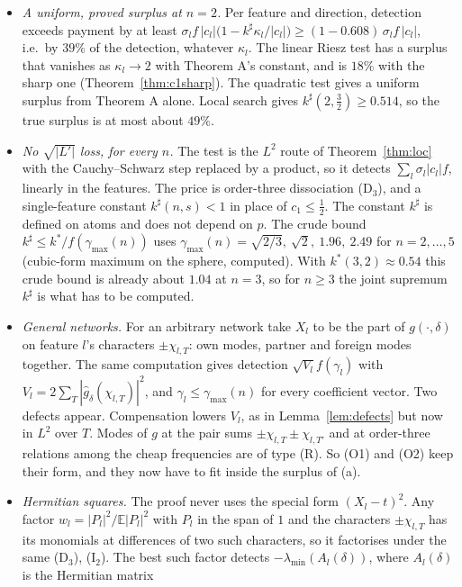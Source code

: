 \documentclass[11pt]{article}
\theoremstyle{definition}
\begin{document}
\begin{itemize}
\item[(a)] \emph{A uniform, proved surplus at $n=2$.}  Per feature and direction, detection exceeds payment by at least
$\sigma_lf\,|c_l|\big(1-k^\sharp\kappa_l/|c_l|\big)\ge(1-0.608)\,\sigma_lf\,|c_l|$, i.e.\ by $39\%$ of the detection, whatever $\kappa_l$.  The linear Riesz test has a surplus that
vanishes as $\kappa_l\to2$ with Theorem A's constant, and is $18\%$ with the sharp one (Theorem~\ref{thm:c1sharp}).  The quadratic test gives a uniform surplus from
Theorem A alone.  Local search gives $k^\sharp(2,\frac32)\ge0.514$, so the true surplus is at most about $49\%$.
\item[(b)] \emph{No $\sqrt{|L'|}$ loss, for every $n$.}  The test is the $L^2$ route of Theorem~\ref{thm:loc} with the Cauchy--Schwarz step replaced by a
product, so it detects $\sum_l\sigma_l|c_l|f$, linearly in the features.  The price is order-three dissociation (D$_3$), and a single-feature
constant $k^\sharp(n,s)<1$ in place of $c_1\le\frac12$.  The constant $k^\sharp$ is defined on atoms and does not depend on $p$.  The crude bound
$k^\sharp\le k^*/f(\gamma_{\max}(n))$ uses $\gamma_{\max}(n)=\sqrt{2/3},\ \sqrt2,\ 1.96,\ 2.49$ for $n=2,\dots,5$ (cubic-form maximum on the sphere, computed).  With
$k^*(3,2)\approx0.54$ this crude bound is already about $1.04$ at $n=3$, so for $n\ge3$ the joint supremum $k^\sharp$ is what has to be computed.
\item[(c)] \emph{General networks.}  For an arbitrary network take $X_l$ to be the part of $g(\cdot,\delta)$ on feature $l$'s characters $\pm\chi_{l,T}$: own modes,
partner and foreign modes together.  The same computation gives detection $\sqrt{V_l}f(\gamma_l)$ with $V_l=2\sum_T|\hat g_\delta(\chi_{l,T})|^2$, and
$\gamma_l\le\gamma_{\max}(n)$ for every coefficient vector.  Two defects appear.  Compensation lowers $V_l$, as in Lemma~\ref{lem:defects} but now in $L^2$ over $T$.
Modes of $g$ at the pair sums $\pm\chi_{l,T}\pm\chi_{l,T'}$ and at order-three relations among the cheap frequencies are of type (R).  So (O1) and (O2)
keep their form, and they now have to fit inside the surplus of (a).
\item[(d)] \emph{Hermitian squares.}  The proof never uses the special form $(X_l-t)^2$.  Any factor $w_l=|P_l|^2/\mathbb E|P_l|^2$ with $P_l$ in the span
of $1$ and the characters $\pm\chi_{l,T}$ has its monomials at differences of two such characters, so it factorises under the same
(D$_3$), (I$_2$).  The best such factor detects $-\lambda_{\min}(A_l(\delta))$, where $A_l(\delta)$ is the Hermitian matrix

\end{itemize}
\end{document}
